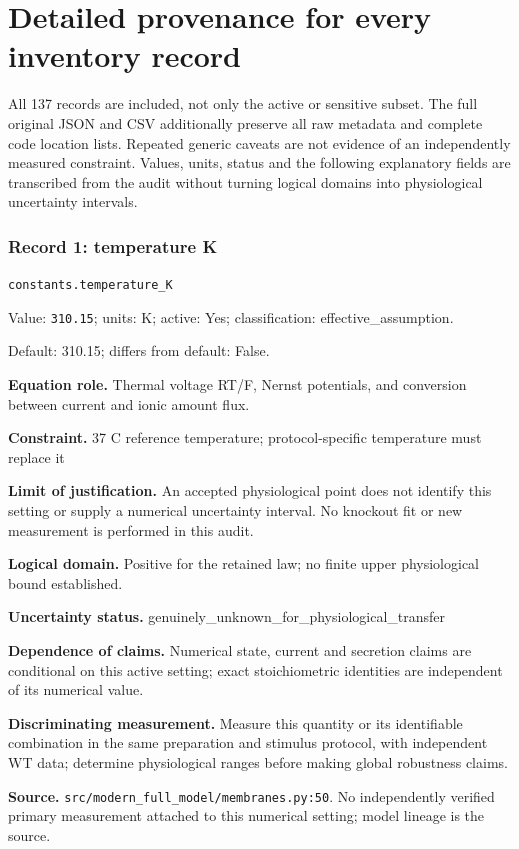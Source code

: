 \section{Detailed provenance for every inventory record}
All 137 records are included, not only the active or sensitive subset. The full original JSON and CSV additionally preserve all raw metadata and complete code location lists. Repeated generic caveats are not evidence of an independently measured constraint. Values, units, status and the following explanatory fields are transcribed from the audit without turning logical domains into physiological uncertainty intervals.
\subsubsection*{Record 1: temperature K}
{\small \nolinkurl{constants.temperature_K}\par

Value: \texttt{310.15}; units: K; active: Yes; classification: effective\_assumption.\par

Default: 310.15; differs from default: False.\par

\textbf{Equation role.} Thermal voltage RT/F, Nernst potentials, and conversion between current and ionic amount flux.\par

\textbf{Constraint.} 37 C reference temperature; protocol-specific temperature must replace it\par

\textbf{Limit of justification.} An accepted physiological point does not identify this setting or supply a numerical uncertainty interval. No knockout fit or new measurement is performed in this audit.\par

\textbf{Logical domain.} Positive for the retained law; no finite upper physiological bound established.\par

\textbf{Uncertainty status.} genuinely\_unknown\_for\_physiological\_transfer\par

\textbf{Dependence of claims.} Numerical state, current and secretion claims are conditional on this active setting; exact stoichiometric identities are independent of its numerical value.\par

\textbf{Discriminating measurement.} Measure this quantity or its identifiable combination in the same preparation and stimulus protocol, with independent WT data; determine physiological ranges before making global robustness claims.\par

\textbf{Source.} \nolinkurl{src/modern_full_model/membranes.py:50}. No independently verified primary measurement attached to this numerical setting; model lineage is the source.\par}

